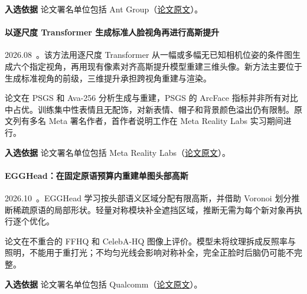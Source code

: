 \textbf{入选依据} 论文署名单位包括 Ant Group（\href{https://arxiv.org/abs/2608.20335}{论文原文}）。

\paragraph{以逐尺度 Transformer 生成标准人脸视角再进行高斯提升}
2026.08~\cite{2608_23410}。该方法用逐尺度 Transformer 从一幅或多幅无已知相机位姿的条件图生成六个指定视角，再用现有像素对齐高斯提升模型重建三维头像。新方法主要位于生成标准视角的前级，三维提升承担跨视角重建与渲染。

论文在 PSGS 和 Ava-256 分析生成与重建，PSGS 的 ArcFace 指标并非所有对比中占优。训练集中性表情且无配饰，对新表情、帽子和背景颜色溢出仍有限制。原文列有多名 Meta 署名作者，首作者说明工作在 Meta Reality Labs 实习期间进行。

\textbf{入选依据} 论文署名单位包括 Meta Reality Labs（\href{https://arxiv.org/html/2608.23410v1}{论文原文}）。

\paragraph{EGGHead：在固定原语预算内重建单图头部高斯}
2026.10~\cite{2610_26898}。EGGHead 学习按头部语义区域分配有限高斯，并借助 Voronoi 划分推断稀疏原语的局部形状。轻量对称模块补全遮挡区域，推断无需为每个新对象再执行逐个优化。

论文在不重合的 FFHQ 和 CelebA-HQ 图像上评价。模型未将纹理拆成反照率与照明，不能用于重打光；不均匀光线会影响对称补全，完全正脸时后脑仍可能不完整。

\textbf{入选依据} 论文署名单位包括 Qualcomm（\href{https://arxiv.org/abs/2610.26898}{论文原文}）。
